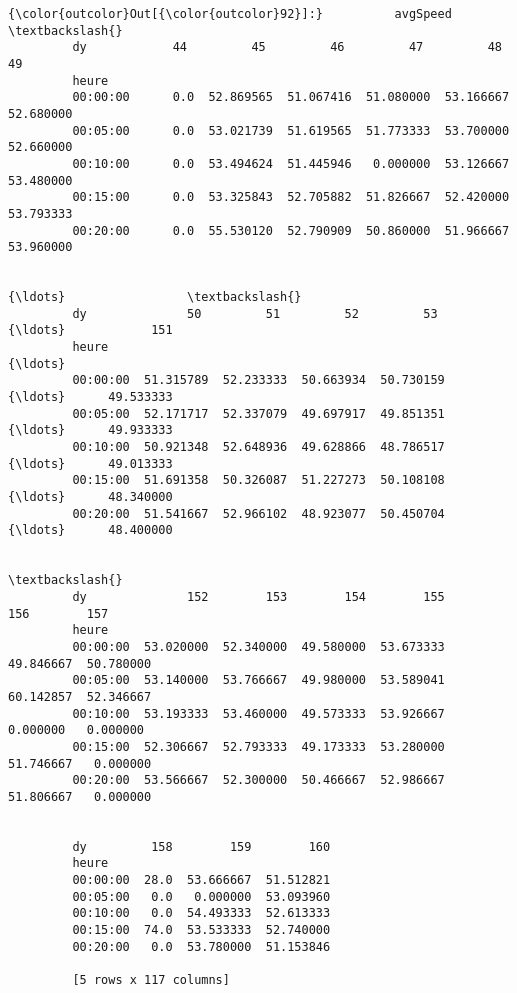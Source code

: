 \documentclass[11pt]{article}
\begin{document}
\begin{Verbatim}[commandchars=\\\{\}]
{\color{outcolor}Out[{\color{outcolor}92}]:}          avgSpeed                                                         \textbackslash{}
         dy            44         45         46         47         48         49    
         heure                                                                      
         00:00:00      0.0  52.869565  51.067416  51.080000  53.166667  52.680000   
         00:05:00      0.0  53.021739  51.619565  51.773333  53.700000  52.660000   
         00:10:00      0.0  53.494624  51.445946   0.000000  53.126667  53.480000   
         00:15:00      0.0  53.325843  52.705882  51.826667  52.420000  53.793333   
         00:20:00      0.0  55.530120  52.790909  50.860000  51.966667  53.960000   
         
                                                                 {\ldots}                 \textbackslash{}
         dy              50         51         52         53     {\ldots}            151   
         heure                                                   {\ldots}                  
         00:00:00  51.315789  52.233333  50.663934  50.730159    {\ldots}      49.533333   
         00:05:00  52.171717  52.337079  49.697917  49.851351    {\ldots}      49.933333   
         00:10:00  50.921348  52.648936  49.628866  48.786517    {\ldots}      49.013333   
         00:15:00  51.691358  50.326087  51.227273  50.108108    {\ldots}      48.340000   
         00:20:00  51.541667  52.966102  48.923077  50.450704    {\ldots}      48.400000   
         
                                                                                     \textbackslash{}
         dy              152        153        154        155        156        157   
         heure                                                                        
         00:00:00  53.020000  52.340000  49.580000  53.673333  49.846667  50.780000   
         00:05:00  53.140000  53.766667  49.980000  53.589041  60.142857  52.346667   
         00:10:00  53.193333  53.460000  49.573333  53.926667   0.000000   0.000000   
         00:15:00  52.306667  52.793333  49.173333  53.280000  51.746667   0.000000   
         00:20:00  53.566667  52.300000  50.466667  52.986667  51.806667   0.000000   
         
                                               
         dy         158        159        160  
         heure                                 
         00:00:00  28.0  53.666667  51.512821  
         00:05:00   0.0   0.000000  53.093960  
         00:10:00   0.0  54.493333  52.613333  
         00:15:00  74.0  53.533333  52.740000  
         00:20:00   0.0  53.780000  51.153846  
         
         [5 rows x 117 columns]
\end{Verbatim}
            
\end{document}
